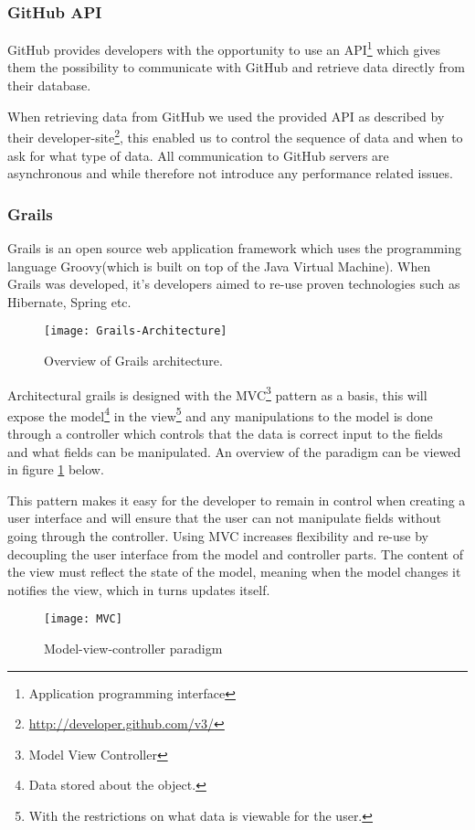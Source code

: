 \subsubsection{GitHub API}
\label{githubapi}
GitHub provides developers with the opportunity to use an API\footnote{Application programming interface} which gives them the possibility to communicate with GitHub and retrieve data directly from their database.  

When retrieving data from GitHub we used the provided API as described by their developer-site\footnote{\url{http://developer.github.com/v3/}}, this enabled us to control the sequence of data and when to ask for what type of data. All communication to GitHub servers are asynchronous and while therefore not introduce any performance related issues. 
 
\subsubsection{Grails}
Grails is an open source web application framework which uses the programming language Groovy(which is built on top of the Java Virtual Machine). When Grails was developed, it's developers aimed to re-use proven technologies such as Hibernate, Spring etc. 

\begin{figure}[H]
\centering
    \texttt{[image: Grails-Architecture]}
\caption{Overview of Grails architecture.}
\end{figure}

Architectural grails is designed with the MVC\footnote{Model View Controller} pattern as a basis, this will expose the model\footnote{Data stored about the object.} in the view\footnote{With the restrictions on what data is viewable for the user.} and any manipulations to the model is done through a controller which controls that the data is correct input to the fields and what fields can be manipulated. An overview of the paradigm can be viewed in figure \ref{mvc-paradigm} below.

This pattern makes it easy for the developer to remain in control when creating a user interface and will ensure that the user can not manipulate fields without going through the controller\citep{reenskaug2009dci}. Using MVC increases flexibility and re-use by decoupling the user interface from the model and controller parts. The content of the view must reflect the state of the model, meaning when the model changes it notifies the view, which in turns updates itself. 
\begin{figure}[H]
    \centering
        \texttt{[image: MVC]}
    \caption{Model-view-controller paradigm}
    \label{mvc-paradigm}
\end{figure}

